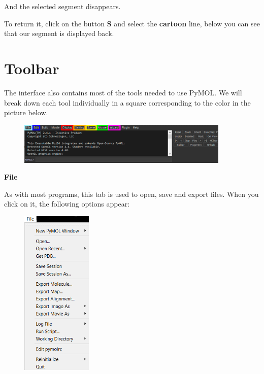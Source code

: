 \documentclass{article}
\begin{document}
And the selected segment disappears.

To return it, click on the button {\Large \textbf{S}} and select the \textbf{cartoon} line, below you can see that our segment is displayed back. \\


\section{Toolbar}

The interface also contains most of the tools needed to use PyMOL. We will break down each tool individually in a square corresponding to the color in the picture below. \\

\begin{figure}[h!]
    \centering
    \includegraphics[width=0.9\textwidth]{workshops/pymol/imgs/toolbar.png}
    \caption[]{}
    \label{toolbar}
\end{figure}

\begin{center}
    \Large \textbf{File}
\end{center}

As with most programs, this tab is used to open, save and export files. When you click on it, the following options appear: \\

\begin{figure}[h!]
    \centering
    \includegraphics[width=0.3\textwidth]{workshops/pymol/imgs/filetab.png}
    \caption[]{}
    \label{filetab}
\end{figure}
\end{document}
